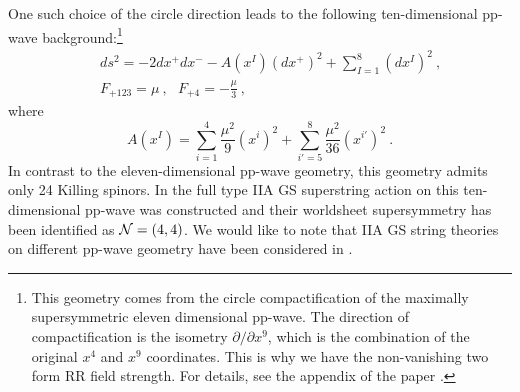 \documentclass[a4paper,12pt]{article}
\begin{document}
One such choice of the circle direction leads to the following
ten-dimensional pp-wave background\cite{hyu074,sug029}:\footnote{This
geometry comes from the circle compactification of the maximally
supersymmetric eleven dimensional pp-wave.  The direction of
compactification is the isometry $\partial / \partial x^9$, which is
the combination of the original $x^4$ and $x^9$ coordinates.  This is
why we have the non-vanishing two form RR field strength.  For
details, see the appendix of the paper \cite{hyu074}.}
\begin{eqnarray}
& & ds^2 = - 2 dx^+ dx^-
    - A(x^I) (dx^+)^2  + \sum^8_{I=1} (dx^I)^2~,
                                      \nonumber \\
& & F_{+123} = \mu~,\ \ \  F_{+4} = -\frac{\mu}{3}~,
\label{pp-wave}
\end{eqnarray}
where
\begin{equation}
A(x^I) = \sum^4_{i=1} \frac{\mu^2}{9} (x^i)^2
            +\sum^8_{i'=5} \frac{\mu^2}{36} (x^{i'})^2~.
\end{equation}
In contrast to the eleven-dimensional pp-wave geometry, this geometry admits
only 24 Killing spinors. In \cite{hyu074} the full 
type IIA GS superstring action on this ten-dimensional pp-wave 
was constructed and their worldsheet 
supersymmetry has been identified as ${\cal N}=(4,4)$. 
We would like to note that IIA GS string theories on different pp-wave
geometry have been considered in \cite{ali037,cve082,cve229}.
\end{document}
